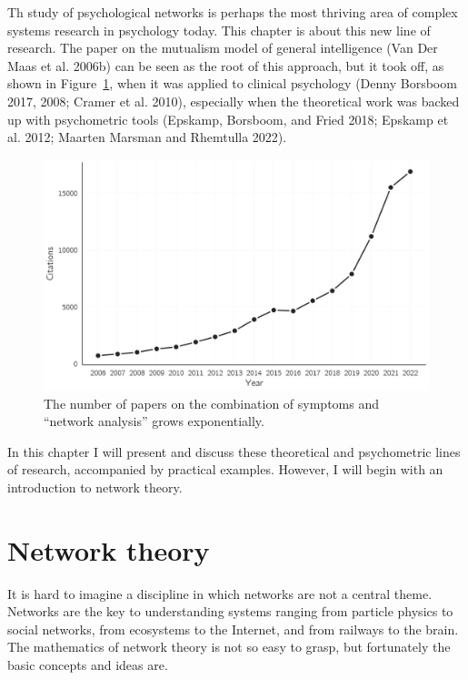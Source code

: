 \documentclass[
  a4paper,
  DIV=11,
  numbers=noendperiod,
  oneside]{scrreprt}
\begin{document}
Th study of psychological networks is perhaps the most thriving area of
complex systems research in psychology today. This chapter is about this
new line of research. The paper on the mutualism model of general
intelligence (Van Der Maas et al. 2006b) can be seen as the root of this
approach, but it took off, as shown in Figure~\ref{fig-ch6-img1-old-70},
when it was applied to clinical psychology (Denny Borsboom 2017, 2008;
Cramer et al. 2010), especially when the theoretical work was backed up
with psychometric tools (Epskamp, Borsboom, and Fried 2018; Epskamp et
al. 2012; Maarten Marsman and Rhemtulla 2022).

\begin{figure}

{\centering \includegraphics{media/ch6/fig-ch6-img1-old-70.jpg}

}

\caption{\label{fig-ch6-img1-old-70}The number of papers on the
combination of symptoms and ``network analysis'' grows exponentially.}

\end{figure}

In this chapter I will present and discuss these theoretical and
psychometric lines of research, accompanied by practical examples.
However, I will begin with an introduction to network theory.

\hypertarget{sec-Network-theory}{%
\section{Network theory}\label{sec-Network-theory}}

It is hard to imagine a discipline in which networks are not a central
theme. Networks are the key to understanding systems ranging from
particle physics to social networks, from ecosystems to the Internet,
and from railways to the brain. The mathematics of network theory is not
so easy to grasp, but fortunately the basic concepts and ideas are.
\end{document}
